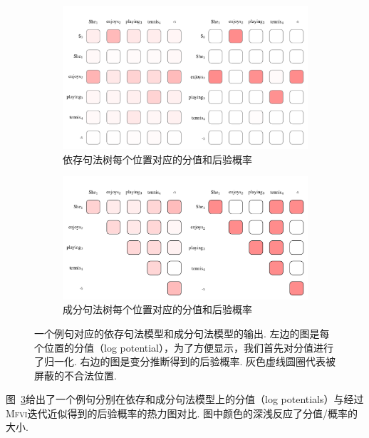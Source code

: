 \begin{figure}[tb!]
  \centering
  \begin{subfigure}[b]{0.9\textwidth}
    \centering
    \includegraphics[scale=0.75]{figures/dep-probs.pdf}
    \caption{依存句法树每个位置对应的分值和后验概率}
    \label{fig:dep-probs}
  \end{subfigure}
  \begin{subfigure}[b]{0.9\textwidth}
    \centering
    \includegraphics[scale=0.75]{figures/con-probs.pdf}
    \caption{成分句法树每个位置对应的分值和后验概率}
    \label{fig:con-probs}
  \end{subfigure}
  \caption{一个例句对应的依存句法模型和成分句法模型的输出. 左边的图是每个位置的分值（log potential），为了方便显示，我们首先对分值进行了归一化.
    右边的图是变分推断得到的后验概率. 灰色虚线圆圈代表被屏蔽的不合法位置.}

  \label{fig:vi-probs}
\end{figure}

图~\ref{fig:vi-probs}给出了一个例句分别在依存和成分句法模型上的分值（log potentials）与经过\textsc{Mfvi}迭代近似得到的后验概率的热力图对比.
图中颜色的深浅反应了分值/概率的大小.

